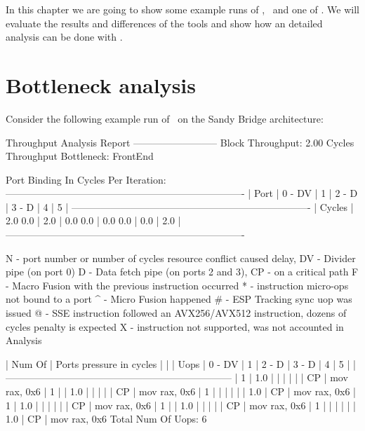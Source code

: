 
In this chapter we are going to show some example runs of \iaca, \suaca\ and one of \osaca. We will evaluate the results and differences of the tools and show how an detailed analysis can be done with \suaca.

\section{Bottleneck analysis}

Consider the following example run of \iaca\ on the Sandy Bridge architecture:

\begin{example}
        Throughput Analysis Report
        --------------------------
        Block Throughput: 2.00 Cycles       Throughput Bottleneck: FrontEnd
        
        Port Binding In Cycles Per Iteration:
        -------------------------------------------------------------------------
        |  Port  |  0   -  DV  |  1   |  2   -  D   |  3   -  D   |  4   |  5   |
        -------------------------------------------------------------------------
        | Cycles | 2.0    0.0  | 2.0  | 0.0    0.0  | 0.0    0.0  | 0.0  | 2.0  |
        -------------------------------------------------------------------------
        
        N - port number or number of cycles resource conflict caused delay, DV - Divider pipe (on port 0)
        D - Data fetch pipe (on ports 2 and 3), CP - on a critical path
        F - Macro Fusion with the previous instruction occurred
        * - instruction micro-ops not bound to a port
        ^ - Micro Fusion happened
        # - ESP Tracking sync uop was issued
        @ - SSE instruction followed an AVX256/AVX512 instruction, dozens of cycles penalty is expected
        X - instruction not supported, was not accounted in Analysis
        
        | Num Of |              Ports pressure in cycles               |    |
        |  Uops  |  0  - DV  |  1  |  2  -  D  |  3  -  D  |  4  |  5  |    |
        ---------------------------------------------------------------------
        |   1    | 1.0       |     |           |           |     |     | CP | mov rax, 0x6
        |   1    |           | 1.0 |           |           |     |     | CP | mov rax, 0x6
        |   1    |           |     |           |           |     | 1.0 | CP | mov rax, 0x6
        |   1    | 1.0       |     |           |           |     |     | CP | mov rax, 0x6
        |   1    |           | 1.0 |           |           |     |     | CP | mov rax, 0x6
        |   1    |           |     |           |           |     | 1.0 | CP | mov rax, 0x6
        Total Num Of Uops: 6
\end{example}

